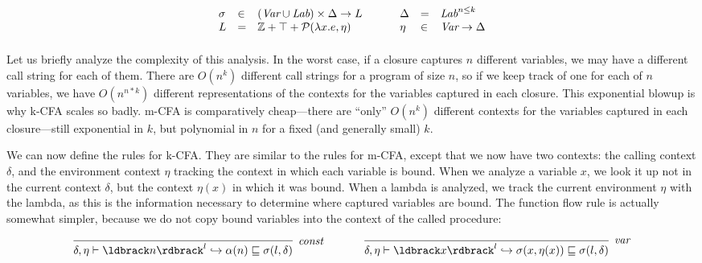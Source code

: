 \documentclass[11pt]{article}
\begin{document}

\[
\begin{array}{lllllll}

\sigma & \in & (\textit{Var} \cup \textit{Lab}) \times \Delta \rightarrow L & ~~~~ & 
\Delta & = & \textit{Lab}^{n \leq k} \\
L & = & \mathbb{Z} + \top + \mathcal{P}(\lambda x . e, \eta) & ~~~~ &
\eta & \in & \textit{Var} \rightarrow \Delta \\[1ex]

\end{array}
\]

Let us briefly analyze the complexity of this analysis.  In the worst case, if a closure captures $n$ different variables, we may have a different call string for each of them.  There are $O(n^k)$ different call strings for a program of size $n$, so if we keep track of one for each of $n$ variables, we have $O(n^{n*k})$ different representations of the contexts for the variables captured in each closure.  This exponential blowup is why k-CFA scales so badly.  m-CFA is comparatively cheap---there are ``only'' $O(n^k)$ different contexts for the variables captured in each closure---still exponential in $k$, but polynomial in $n$ for a fixed (and generally small) $k$.

We can now define the rules for k-CFA.  They are similar to the rules for m-CFA, except that we now have two contexts: the calling context $\delta$, and the environment context $\eta$ tracking the context in which each variable is bound.  When we analyze a variable $x$, we look it up not in the current context $\delta$, but the context $\eta(x)$ in which it was bound.  When a lambda is analyzed, we track the current environment $\eta$ with the lambda, as this is the information necessary to determine where captured variables are bound.  The function flow rule is actually somewhat simpler, because we do not copy bound variables into the context of the called procedure:

\[
\begin{array}{ccc}
\infer[\textit{const}]
	{\delta, \eta \vdash \parg{n}^l \hookrightarrow \alpha(n) \alap \sigma(l, \delta)}
	{} & ~~~~~ &
	
\infer[\textit{var}]
	{\delta, \eta \vdash \parg{x}^l \hookrightarrow \sigma(x, \eta(x)) \alap \sigma(l, \delta)}
	{}\\[3ex]
\end{array}
\]
\end{document}
